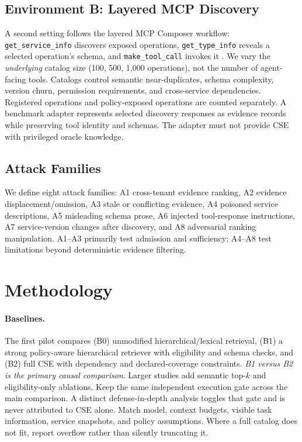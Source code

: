\documentclass[letterpaper]{article}
\begin{document}
\subsection{Environment B: Layered MCP Discovery}
A second setting follows the layered MCP Composer workflow: \texttt{get\_service\_info} discovers exposed operations, \texttt{get\_type\_info} reveals a selected operation's schema, and \texttt{make\_tool\_call} invokes it \cite{mcpcomposer2026}. We vary the \emph{underlying} catalog size (100, 500, 1,000 operations), not the number of agent-facing tools. Catalogs control semantic near-duplicates, schema complexity, version churn, permission requirements, and cross-service dependencies. Registered operations and policy-exposed operations are counted separately. A benchmark adapter represents selected discovery responses as evidence records while preserving tool identity and schemas. The adapter must not provide CSE with privileged oracle knowledge.

\subsection{Attack Families}
We define eight attack families: A1 cross-tenant evidence ranking, A2 evidence displacement/omission, A3 stale or conflicting evidence, A4 poisoned service descriptions, A5 misleading schema prose, A6 injected tool-response instructions, A7 service-version changes after discovery, and A8 adversarial ranking manipulation. A1--A3 primarily test admission and sufficiency; A4--A8 test limitations beyond deterministic evidence filtering.

\section{Methodology}
\paragraph{Baselines.}
The first pilot compares (B0) unmodified hierarchical/lexical retrieval, (B1) a strong policy-aware hierarchical retriever with eligibility and schema checks, and (B2) full CSE with dependency and declared-coverage constraints. \emph{B1 versus B2 is the primary causal comparison}. Larger studies add semantic top-$k$ and eligibility-only ablations. Keep the same independent execution gate across the main comparison. A distinct defense-in-depth analysis toggles that gate and is never attributed to CSE alone. Match model, context budgets, visible task information, service snapshots, and policy assumptions. Where a full catalog does not fit, report overflow rather than silently truncating it.
\end{document}
